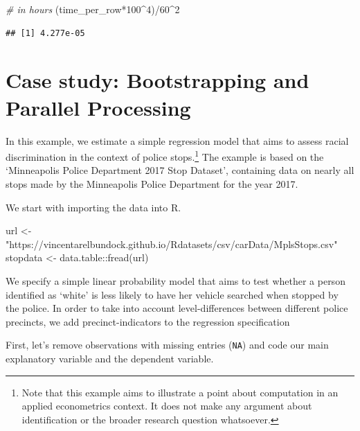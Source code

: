 \documentclass[
  12pt,
]{style/krantz}
\newenvironment{Shaded}{\begin{snugshade}}{\end{snugshade}}
\newcommand{\CommentTok}[1]{\textcolor[rgb]{0.56,0.35,0.01}{\textit{#1}}}
\newcommand{\DecValTok}[1]{\textcolor[rgb]{0.00,0.00,0.81}{#1}}
\newcommand{\FunctionTok}[1]{\textcolor[rgb]{0.00,0.00,0.00}{#1}}
\newcommand{\NormalTok}[1]{#1}
\newcommand{\OtherTok}[1]{\textcolor[rgb]{0.56,0.35,0.01}{#1}}
\newcommand{\SpecialCharTok}[1]{\textcolor[rgb]{0.00,0.00,0.00}{#1}}
\newcommand{\StringTok}[1]{\textcolor[rgb]{0.31,0.60,0.02}{#1}}
\begin{document}
\begin{Shaded}
\begin{Highlighting}[]
\CommentTok{\# in hours}
\NormalTok{(time\_per\_row}\SpecialCharTok{*}\DecValTok{100}\SpecialCharTok{\^{}}\DecValTok{4}\NormalTok{)}\SpecialCharTok{/}\DecValTok{60}\SpecialCharTok{\^{}}\DecValTok{2} 
\end{Highlighting}
\end{Shaded}

\begin{verbatim}
## [1] 4.277e-05
\end{verbatim}

\hypertarget{case-study-bootstrapping-and-parallel-processing}{%
\section{Case study: Bootstrapping and Parallel Processing}\label{case-study-bootstrapping-and-parallel-processing}}

In this example, we estimate a simple regression model that aims to assess racial discrimination in the context of police stops.\footnote{Note that this example aims to illustrate a point about computation in an applied econometrics context. It does not make any argument about identification or the broader research question whatsoever.} The example is based on the `Minneapolis Police Department 2017 Stop Dataset', containing data on nearly all stops made by the Minneapolis Police Department for the year 2017.

We start with importing the data into R.

\begin{Shaded}
\begin{Highlighting}[]
\NormalTok{url }\OtherTok{\textless{}{-}} \StringTok{"https://vincentarelbundock.github.io/Rdatasets/csv/carData/MplsStops.csv"}
\NormalTok{stopdata }\OtherTok{\textless{}{-}}\NormalTok{ data.table}\SpecialCharTok{::}\FunctionTok{fread}\NormalTok{(url) }
\end{Highlighting}
\end{Shaded}

We specify a simple linear probability model that aims to test whether a person identified as `white' is less likely to have her vehicle searched when stopped by the police. In order to take into account level-differences between different police precincts, we add precinct-indicators to the regression specification

First, let's remove observations with missing entries (\texttt{NA}) and code our main explanatory variable and the dependent variable.
\end{document}
